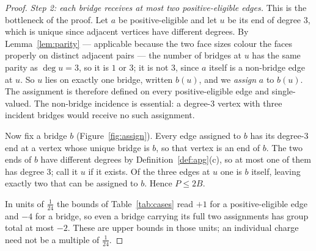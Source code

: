 \documentclass{baustms}
\theoremstyle{cupthm}
\theoremstyle{cupdefn}
\theoremstyle{cuprem}
\begin{document}
\begin{proof}
\smallskip
\emph{Step 2: each bridge receives at most two positive-eligible edges.} This is
the bottleneck of the proof. Let $a$ be positive-eligible and let $u$ be its end
of degree $3$, which is unique since adjacent vertices have different degrees. By
Lemma~\ref{lem:parity} --- applicable because the two face sizes colour the faces
properly on distinct adjacent pairs --- the number of bridges at $u$ has the same
parity as $\deg u = 3$, so it is $1$ or $3$; it is not $3$, since $a$ itself is a
non-bridge edge at $u$. So $u$ lies on exactly one bridge, written $b(u)$, and we
\emph{assign} $a$ to $b(u)$. The assignment is therefore defined on every
positive-eligible edge and single-valued. The non-bridge incidence is essential:
a degree-$3$ vertex with three incident bridges would receive no such assignment.

Now fix a bridge $b$ (Figure~\ref{fig:assign}). Every edge assigned to $b$ has its degree-$3$ end at a
vertex whose unique bridge is $b$, so that vertex is an end of $b$. The two ends
of $b$ have different degrees by Definition~\ref{def:apg}(c), so at most one of
them has degree $3$; call it $u$ if it exists. Of the three edges at $u$ one is
$b$ itself, leaving exactly two that can be assigned to $b$. Hence $P \le 2B$.

In units of $\tfrac1{24}$ the bounds of Table~\ref{tab:cases} read $+1$ for a
positive-eligible edge and $-4$ for a bridge, so even a bridge carrying its full two
assignments has group total at most $-2$. These are upper bounds in those units;
an individual charge need not be a multiple of $\tfrac1{24}$.


\end{proof}
\end{document}
